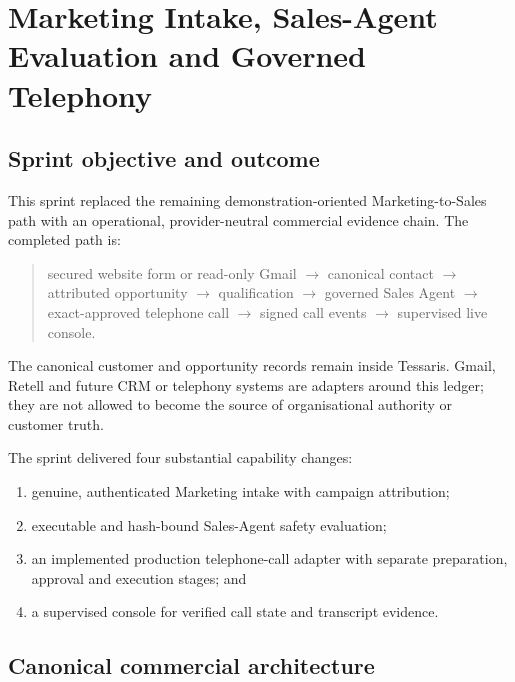 
\section{Marketing Intake, Sales-Agent Evaluation and Governed Telephony}
\label{sec:marketing-sales-telephony-sprint}

\subsection{Sprint objective and outcome}

This sprint replaced the remaining demonstration-oriented Marketing-to-Sales path with an operational, provider-neutral commercial evidence chain. The completed path is:

\begin{quote}
secured website form or read-only Gmail
$\rightarrow$ canonical contact
$\rightarrow$ attributed opportunity
$\rightarrow$ qualification
$\rightarrow$ governed Sales Agent
$\rightarrow$ exact-approved telephone call
$\rightarrow$ signed call events
$\rightarrow$ supervised live console.
\end{quote}

The canonical customer and opportunity records remain inside Tessaris. Gmail, Retell and future CRM or telephony systems are adapters around this ledger; they are not allowed to become the source of organisational authority or customer truth.

The sprint delivered four substantial capability changes:

\begin{enumerate}[leftmargin=*]
    \item genuine, authenticated Marketing intake with campaign attribution;
    \item executable and hash-bound Sales-Agent safety evaluation;
    \item an implemented production telephone-call adapter with separate preparation, approval and execution stages; and
    \item a supervised console for verified call state and transcript evidence.
\end{enumerate}

\subsection{Canonical commercial architecture}

